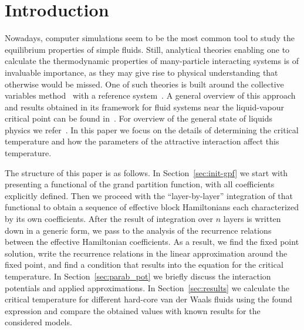 \section{Introduction}

Nowadays, computer simulations seem to be the most common tool to study the equilibrium properties of simple fluids. Still, analytical theories enabling one to calculate the thermodynamic properties of many-particle interacting systems is of invaluable importance, as they may give rise to physical understanding that otherwise would be missed. One of such theories is built around the collective variables method~\cite{Yukh1980book} with a reference system~\cite{Yukh1990}. A general overview of this approach and results obtained in its framework for fluid systems near the liquid-vapour critical point can be found in~\cite{Yukh2015En}. For overview of the general state of liquids physics we refer~\cite{hansen2013theory,adamBulavin2006book}. In this paper we focus on the details of determining the critical temperature and how the parameters of the attractive interaction affect this temperature. 

The structure of this paper is as follows. In Section~\ref{sec:init-gpf} we start with presenting a functional of the grand partition function, with all coefficients explicitly defined. Then we proceed with the ``layer-by-layer'' integration of that functional to obtain a sequence of effective block Hamiltonians each characterized by its own coefficients. After the result of integration over $n$ layers is written down in a generic form, we pass to the analysis of the recurrence relations between the effective Hamiltonian coefficients. As a result, we find the fixed point solution, write the recurrence relations in the linear approximation around the fixed point, and find a condition that results into the equation for the critical temperature. In Section~\ref{sec:parab_pot} we briefly discuss the interaction potentials and applied approximations. In Section~\ref{sec:results} we calculate the critical temperature for different hard-core van der Waals fluids using the found expression and compare the obtained values with known results for the considered models.


